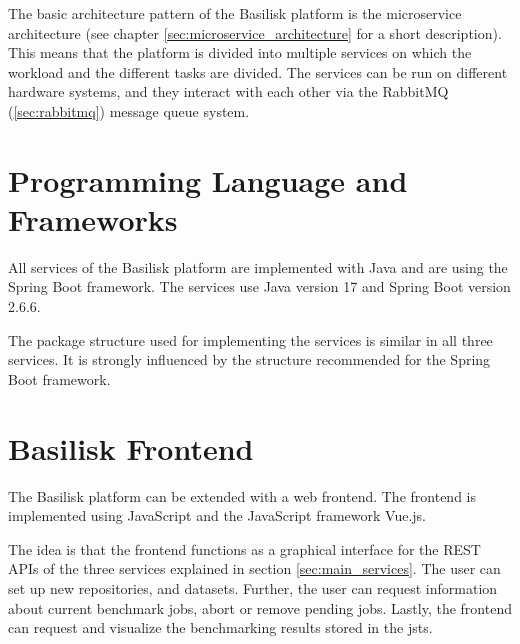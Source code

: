 The basic architecture pattern of the Basilisk platform is the microservice architecture (see chapter \ref{sec:microservice_architecture} for a short description). 
This means that the platform is divided into multiple services on which the workload and the different tasks are divided.
The services can be run on different hardware systems, and they interact with each other via the RabbitMQ (\ref{sec:rabbitmq}) message queue system.
\\

\section{Programming Language and Frameworks}
\label{sec:prog_lang_and_framework}
All services of the Basilisk platform are implemented with Java and are using the Spring Boot framework.
The services use Java version 17 and Spring Boot version 2.6.6.

The package structure used for implementing the services is similar in all three services.
It is strongly influenced by the structure recommended for the Spring Boot framework.






\section{Basilisk Frontend}
\label{sec:basilisk_frontend}
The Basilisk platform can be extended with a web frontend.
The frontend is implemented using JavaScript and the JavaScript framework Vue.js.

The idea is that the frontend functions as a graphical interface for the REST APIs of the three services explained in section \ref{sec:main_services}.
The user can set up new repositories, \tsp{} and datasets.
Further, the user can request information about current benchmark jobs, abort or remove pending jobs.
Lastly, the frontend can request and visualize the benchmarking results stored in the \acl{jsts}.







